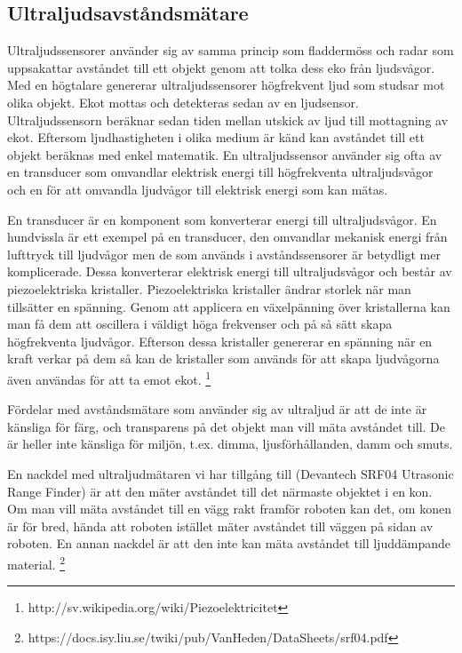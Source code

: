 \documentclass[a4paper,12pt,fleqn]{article}
\begin{document}
\subsection{Ultraljudsavståndsmätare}
Ultraljudssensorer använder sig av samma princip som fladdermöss och radar som uppsakattar avståndet till ett objekt genom att tolka dess eko från ljudsvågor. Med en högtalare genererar ultraljudssensorer högfrekvent ljud som studsar mot olika objekt. Ekot mottas och detekteras sedan av en ljudsensor. Ultraljudssensorn beräknar sedan tiden mellan utskick av ljud till mottagning av ekot. Eftersom ljudhastigheten i olika medium är känd kan avståndet till ett objekt beräknas med enkel matematik. En ultraljudssensor använder sig ofta av en transducer som omvandlar elektrisk energi till högfrekventa ultraljudsvågor och en för att omvandla ljudvågor till elektrisk energi som kan mätas.

En transducer är en komponent som konverterar energi till ultraljudsvågor. En hundvissla är ett exempel på en transducer, den omvandlar mekanisk energi från lufttryck till ljudvågor men de som används i avståndssensorer är betydligt mer komplicerade. Dessa konverterar elektrisk energi till ultraljudsvågor och består av piezoelektriska kristaller. Piezoelektriska kristaller ändrar storlek när man tillsätter en spänning. Genom att applicera en växelpänning över kristallerna kan man få dem att oscillera i väldigt höga frekvenser och på så sätt skapa högfrekventa ljudvågor. Efterson dessa kristaller genererar en spänning när en kraft verkar på dem så kan de kristaller som används för att skapa ljudvågorna även användas för att ta emot ekot.
\footnote{http://sv.wikipedia.org/wiki/Piezoelektricitet}

Fördelar med avståndsmätare som använder sig av ultraljud är att de inte är känsliga för färg, och transparens på det objekt man vill mäta avståndet till. De är heller inte känsliga för miljön, t.ex. dimma, ljusförhållanden, damm och smuts.

En nackdel med ultraljudmätaren vi har tillgång till (Devantech SRF04 Utrasonic Range Finder) är att den mäter avståndet till det närmaste objektet i en kon. Om man vill mäta avståndet till en vägg rakt framför roboten kan det, om konen är för bred, hända att roboten istället mäter avståndet till väggen på sidan av roboten. En annan nackdel är att den inte kan mäta avståndet till ljuddämpande material.
\footnote{https://docs.isy.liu.se/twiki/pub/VanHeden/DataSheets/srf04.pdf}
\end{document}
